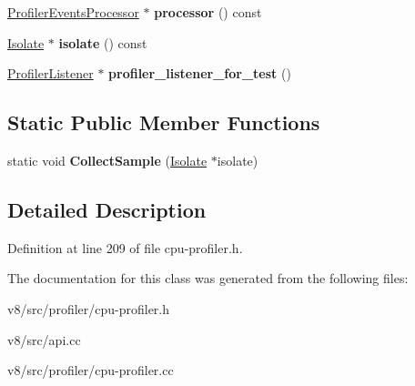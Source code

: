 \begin{DoxyCompactItemize}
\mbox{\label{classv8_1_1internal_1_1CpuProfiler_ac7ef26e773cc4512d653fcf527bc27e8}} 
\mbox{\hyperlink{classv8_1_1internal_1_1ProfilerEventsProcessor}{Profiler\+Events\+Processor}} $\ast$ {\bfseries processor} () const
\item 
\mbox{\label{classv8_1_1internal_1_1CpuProfiler_a9e2e55693c5f077fd1a5fb0fe42bbafe}} 
\mbox{\hyperlink{classv8_1_1internal_1_1Isolate}{Isolate}} $\ast$ {\bfseries isolate} () const
\item 
\mbox{\label{classv8_1_1internal_1_1CpuProfiler_aaa98be6d3af28e88fe63c83c0422dc8f}} 
\mbox{\hyperlink{classv8_1_1internal_1_1ProfilerListener}{Profiler\+Listener}} $\ast$ {\bfseries profiler\+\_\+listener\+\_\+for\+\_\+test} ()
\end{DoxyCompactItemize}
\subsection*{Static Public Member Functions}
\begin{DoxyCompactItemize}
\item 
\mbox{\label{classv8_1_1internal_1_1CpuProfiler_a2b0ba96ea3c616f99a9efae99a2de73d}} 
static void {\bfseries Collect\+Sample} (\mbox{\hyperlink{classv8_1_1internal_1_1Isolate}{Isolate}} $\ast$isolate)
\end{DoxyCompactItemize}


\subsection{Detailed Description}


Definition at line 209 of file cpu-\/profiler.\+h.



The documentation for this class was generated from the following files\+:\begin{DoxyCompactItemize}
\item 
v8/src/profiler/cpu-\/profiler.\+h\item 
v8/src/api.\+cc\item 
v8/src/profiler/cpu-\/profiler.\+cc\end{DoxyCompactItemize}
